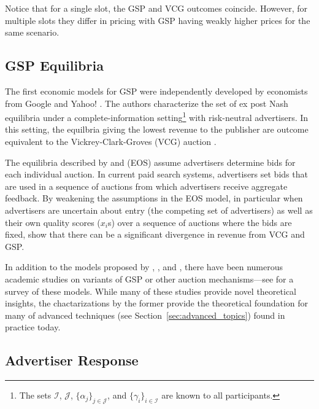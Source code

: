 \documentclass[prodmode,acmtist]{acmsmall} %
\begin{document}
Notice that for a single slot, the GSP and VCG outcomes coincide.
However, for multiple slots they differ in pricing with GSP having weakly higher prices for the same scenario.
 

\subsection{GSP Equilibria} %
\label{sub:equilibrium_characterization}

The first economic models for GSP were independently developed by economists from Google \cite{Varian:2007kx}
and Yahoo! \cite{Edelman:2007vn}.
The authors characterize the set of ex post Nash equilibria under a complete-information setting\footnote{The sets $\mathcal{I}$, $\mathcal{J}$, $\{\alpha_j\}_{j\in \mathcal{J}}$, and $\{\gamma_i\}_{i \in \mathcal{I}}$ are known to all participants.} with risk-neutral advertisers.
In this setting, the equilbria giving the lowest revenue to the publisher are outcome equivalent to the Vickrey-Clark-Groves (VCG) auction \cite{Vickrey:1961ys}.

The equilibria described by  and  (EOS) assume advertisers determine bids for each individual auction. 
In current paid search systems, advertisers set bids that are used in a sequence of auctions from which advertisers receive aggregate feedback. 
By weakening the assumptions in the EOS model, in particular when advertisers are uncertain about entry (the competing set of advertisers) as well as their own quality scores ($x_i$s) over a sequence of auctions where the bids are fixed,  show that there can be a significant divergence in revenue from VCG and GSP.

In addition to the models proposed by , , and , there have been numerous academic studies on variants of GSP or other auction mechanisms---see  for a survey of these models.
While many of these studies provide novel theoretical insights, the chactarizations by the former provide the theoretical foundation for many of advanced techniques (see Section~\ref{sec:advanced_topics}) found in practice today.


\subsection{Advertiser Response}
\end{document}
